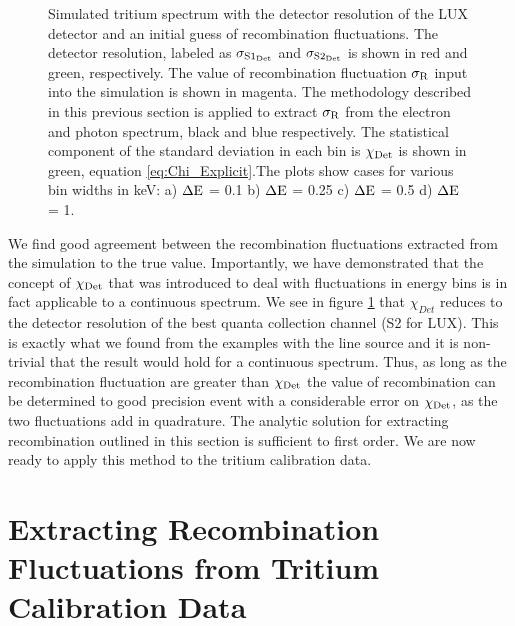\begin{figure}[h!]
\caption{Simulated tritium spectrum with the detector resolution of the LUX detector and an initial guess of recombination fluctuations. The detector resolution, labeled as $\rm \sigma_{S1_{Det}}$ and $\rm \sigma_{S2_{Det}}$ is shown in red and green, respectively. The value of recombination fluctuation $\rm \sigma_R$ input into the simulation is shown in magenta. The methodology described in this previous section is applied to extract $\rm \sigma_R$ from the electron and photon spectrum, black and blue respectively. The statistical component of the standard deviation in each bin is $\rm \chi_{Det}$ is shown in green, equation \ref{eq:Chi_Explicit}.The plots show cases for various bin widths in keV: a) $\rm \Delta E$ = 0.1 b) $\rm \Delta E$ = 0.25 c) $\rm \Delta E$ = 0.5 d) $\rm \Delta E$ = 1.   }
\label{fig:T_Var}
\end{figure}
\renewcommand{\baselinestretch}{2}
\small\normalsize

 We find good agreement between the recombination fluctuations extracted from the simulation to the true value. Importantly, we have demonstrated that the concept of $\rm \chi_{Det}$ that was introduced to deal with fluctuations in energy bins is in fact applicable to a continuous spectrum. We see in figure \ref{fig:T_Var} that $\chi_{Det}$ reduces to the detector resolution of the best quanta collection channel (S2 for LUX). This is exactly what we found from the examples with the \KrCal line source and it is non-trivial that the result would hold for a continuous spectrum. Thus, as long as the recombination fluctuation are greater than $\rm \chi_{Det}$ the value of recombination can be determined to good precision event with a considerable error on $\rm \chi_{Det}$, as the two fluctuations add in quadrature. The analytic solution for extracting recombination outlined in this section is sufficient to first order. We are now ready to apply this method to the tritium calibration data.
 
 


\section{Extracting Recombination Fluctuations from Tritium Calibration Data}
\label{sec:Recomb_Data}

